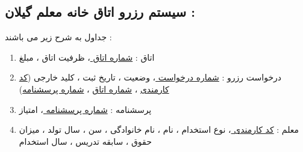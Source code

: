 \documentclass{article}
\begin{document}
\subsection*{سیستم رزرو اتاق خانه معلم گیلان : }
جداول به شرح زیر می باشند  : 
\begin{center}
	\begin{enumerate}
		\item اتاق  : 
		\underline{شماره اتاق }
		، ظرفیت اتاق ، مبلغ 
		\item درخواست رزرو  : 
		\underline{شماره درخواست }
		، وضعیت ، تاریخ ثبت ، کلید خارجی (\underline{کد کارمندی} ، \underline{شماره اتاق} ، \underline{شماره پرسشنامه})
		\item پرسشنامه : 
		\underline{شماره پرسشنامه }
		، امتیاز 
		\item معلم : 
		‌\underline{کد کارمندی }
		، نوع استخدام ، نام ، نام خانوادگی ، سن ، سال تولد ، میزان حقوق ، سابقه تدریس ، سال استخدام 
	\end{enumerate}
\end{center}
\end{document}
